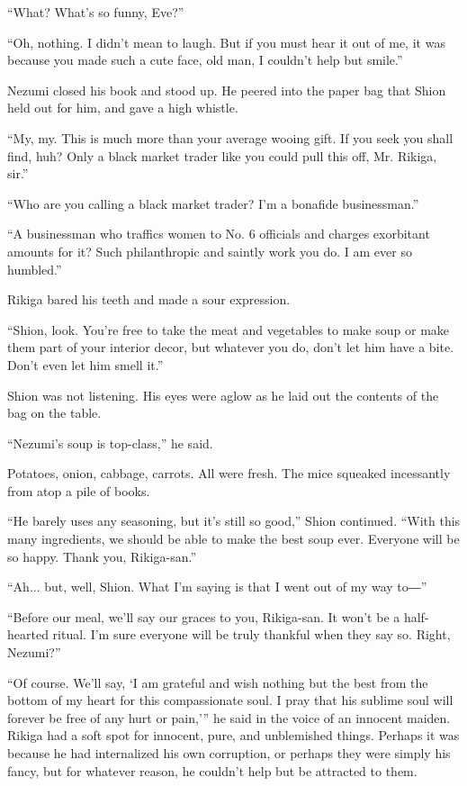 ``What? What's so funny, Eve?''

``Oh, nothing. I didn't mean to laugh. But if you must hear it out of
me, it was because you made such a cute face, old man, I couldn't help
but smile.''

Nezumi closed his book and stood up. He peered into the paper bag that
Shion held out for him, and gave a high whistle.

``My, my. This is much more than your average wooing gift. If you seek
you shall find, huh? Only a black market trader like you could pull this
off, Mr. Rikiga, sir.''

``Who are you calling a black market trader? I'm a bonafide
businessman.''

``A businessman who traffics women to No. 6 officials and charges
exorbitant amounts for it? Such philanthropic and saintly work you do. I
am ever so humbled.''

Rikiga bared his teeth and made a sour expression.

``Shion, look. You're free to take the meat and vegetables to make soup
or make them part of your interior decor, but whatever you do, don't let
him have a bite. Don't even let him smell it.''

Shion was not listening. His eyes were aglow as he laid out the contents
of the bag on the table.

``Nezumi's soup is top-class,'' he said.

Potatoes, onion, cabbage, carrots. All were fresh. The mice squeaked
incessantly from atop a pile of books.

``He barely uses any seasoning, but it's still so good,'' Shion
continued. ``With this many ingredients, we should be able to make the
best soup ever. Everyone will be so happy. Thank you, Rikiga-san.''

``Ah... but, well, Shion. What I'm saying is that I went out of my way
to―''

``Before our meal, we'll say our graces to you, Rikiga-san. It won't be
a half-hearted ritual. I'm sure everyone will be truly thankful when
they say so. Right, Nezumi?''

``Of course. We'll say, `I am grateful and wish nothing but the best
from the bottom of my heart for this compassionate soul. I pray that his
sublime soul will forever be free of any hurt or pain,''' he said in the
voice of an innocent maiden. Rikiga had a soft spot for innocent, pure,
and unblemished things. Perhaps it was because he had internalized his
own corruption, or perhaps they were simply his fancy, but for whatever
reason, he couldn't help but be attracted to them.

